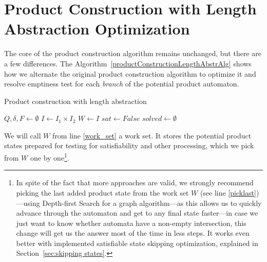 \section{Product Construction with Length Abstraction Optimization}

The core of the product construction algorithm remains unchanged, but there are a few differences. The Algorithm~\ref{productConstructionLengthAbstrAlg} shows how we alternate the original product construction algorithm to optimize it and resolve emptiness test for each \emph{branch} of the potential product automaton.

\begin{algorithm}
\caption{Product construction with length abstraction}\label{productConstructionLengthAbstrAlg}
\DontPrintSemicolon
{}
\BlankLine
$Q, \delta, F \gets \emptyset$ \;
$I \gets I_1 \times I_2$ \;
$W \gets I$ \;\label{work_set}
$sat \gets False$ \;\label{sat}
$solved \gets \emptyset$ \;\label{solved}
\end{algorithm}\DecMargin{1em}

We will call $W$ from line \ref{work_set} a work set. It stores the potential product states prepared for testing for satisfiability and other processing, which we pick from $W$ one by one\footnote{In spite of the fact that more approaches are valid, we strongly recommend picking the last added product state from the work set $W$ (see line \ref{picklast})---using Depth-first Search for a graph algorithm---as this allows us to quickly advance through the automaton and get to any final state faster---in case we just want to know whether automata have a non-empty intersection, this change will get us the answer most of the time in less steps. It works even better with implemented satisfiable state skipping optimization, explained in Section~\ref{sec:skipping states}.}.

